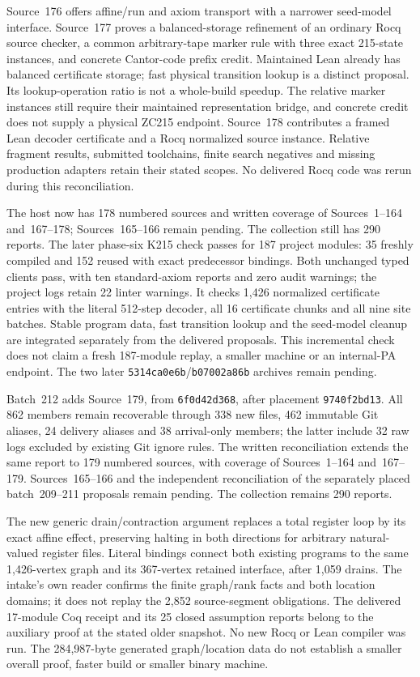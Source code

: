 \documentclass[11pt]{article}
\begin{document}
{Source~176 offers affine/run and axiom transport with a narrower seed-model
interface. Source~177 proves a balanced-storage refinement of an ordinary
Rocq source checker, a common arbitrary-tape marker rule with three exact
215-state instances, and concrete Cantor-code prefix credit. Maintained Lean
already has balanced certificate storage; fast physical transition lookup is
a distinct proposal. Its lookup-operation ratio is not a whole-build speedup.
The relative marker instances still require their maintained representation
bridge, and concrete credit does not supply a physical ZC215 endpoint.
Source~178 contributes a framed Lean decoder certificate and a Rocq normalized
source instance. Relative fragment results, submitted toolchains, finite
search negatives and missing production adapters retain their stated scopes.
No delivered Rocq code was rerun during this reconciliation.

The host now has 178 numbered sources and written coverage of Sources~1--164
and~167--178; Sources~165--166 remain pending. The collection still has
290 reports. The later phase-six K215 check passes for 187 project modules:
35 freshly compiled and 152 reused with exact predecessor bindings.
Both unchanged typed clients pass, with ten standard-axiom reports and zero
audit warnings; the project logs retain 22 linter warnings. It checks
1,426 normalized certificate entries with the literal 512-step decoder,
all 16 certificate chunks and all nine site batches. Stable program data,
fast transition lookup and the seed-model cleanup are integrated separately
from the delivered proposals. This incremental check does not claim a fresh
187-module replay, a smaller machine or an internal-PA endpoint. The two later
\texttt{5314ca0e6b}/\texttt{b07002a86b} archives remain pending.

Batch~212 adds Source~179, from \texttt{6f0d42d368}, after placement
\texttt{9740f2bd13}. All 862 members remain recoverable through 338 new files,
462 immutable Git aliases, 24 delivery aliases and 38 arrival-only members;
the latter include 32 raw logs excluded by existing Git ignore rules.
The written reconciliation extends the same report to 179 numbered sources,
with coverage of Sources~1--164 and~167--179. Sources~165--166 and the independent
reconciliation of the separately placed batch~209--211 proposals remain pending.
The collection remains 290 reports.

The new generic drain/contraction argument replaces a total register loop by
its exact affine effect, preserving halting in both directions for arbitrary
natural-valued register files. Literal bindings connect both existing programs
to the same 1,426-vertex graph and its 367-vertex retained interface, after
1,059 drains. The intake's own reader confirms the finite graph/rank facts and
both location domains; it does not replay the 2,852 source-segment obligations.
The delivered 17-module Coq receipt and its 25 closed assumption reports belong
to the auxiliary proof at the stated older snapshot. No new Rocq or Lean
compiler was run. The 284,987-byte generated graph/location data do not establish
a smaller overall proof, faster build or smaller binary machine.

}
\end{document}
